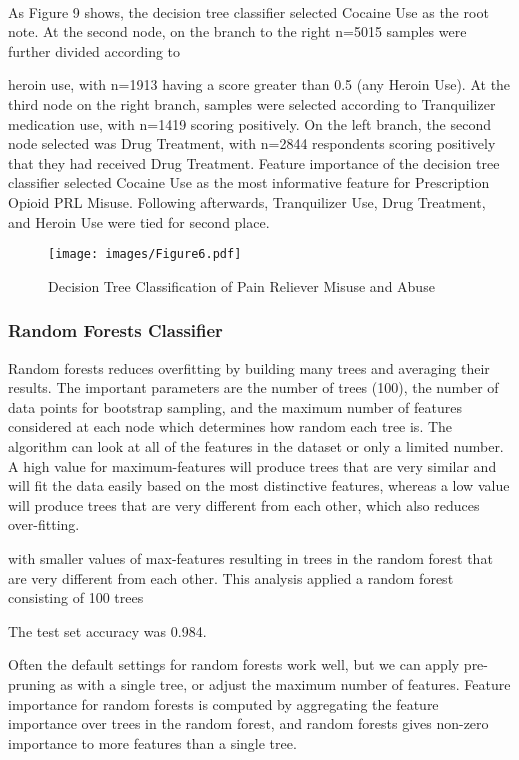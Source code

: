 \\\documentclass[sigconf]{acmart}
\begin{document}
As Figure 9 shows, the decision tree classifier selected Cocaine Use as the 
root note. At the second node, on the branch to the right n=5015 samples were further divided according to 

heroin use, with n=1913 having a score greater 
than 0.5 (any Heroin Use). At the third node on the right branch, samples were selected according to Tranquilizer medication use, with n=1419 scoring positively. On the left branch, the second node selected was Drug Treatment, with n=2844 respondents scoring
positively that they had received Drug Treatment. Feature importance of
the decision tree classifier selected Cocaine Use as the most informative
feature for Prescription Opioid PRL Misuse. Following afterwards, 
Tranquilizer Use, Drug Treatment, and Heroin Use were tied for second place. 

\begin{figure}[!ht]
  \centering\texttt{[image: images/Figure6.pdf]}
  \caption{Decision Tree Classification of Pain Reliever Misuse and Abuse}
  \label{f:Figure6}
\end{figure}


\subsubsection{Random Forests Classifier}

Random forests reduces overfitting by building many trees and averaging 
their results. The important parameters are the number of trees (100), 
the number of data points for bootstrap sampling, and the maximum number of 
features considered at each node which determines how random each tree is. 
The algorithm can look at all of the features in the dataset or only a 
limited number. A high value for maximum-features will produce trees that 
are very similar and will fit the data easily based on the most distinctive 
features, whereas a low value will produce trees that are very different 
from each other, which also reduces over-fitting. 

with smaller values of max-features resulting in trees in the random forest 
that are very different from each other. This analysis applied a random forest 
consisting of 100 trees 

The test set accuracy was 0.984. 

Often the default settings for random forests work well, but we can apply
pre-pruning as with a single tree, or adjust the maximum number of features. 
Feature importance for random forests is computed by aggregating the feature 
importance over trees in the random forest, and random forests gives
non-zero importance to more features than a single tree. 
\end{document}
